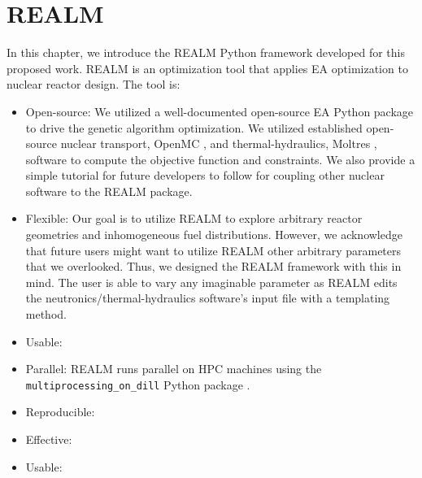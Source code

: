 \chapter{REALM}

In this chapter, we introduce the \gls{REALM} Python framework developed for this
proposed work.
\gls{REALM} is an optimization tool that applies \gls{EA} optimization to 
nuclear reactor design. 
The tool is:  
\begin{itemize}
    \item Open-source: We utilized a well-documented open-source \gls{EA} Python 
    package to drive the genetic algorithm optimization. We utilized established 
    open-source nuclear transport, OpenMC \cite{romano_openmc_2013}, and 
    thermal-hydraulics, Moltres \cite{lindsay_introduction_2018}, software to 
    compute the objective function and constraints. We also provide a simple 
    tutorial for future developers to follow for coupling other nuclear software 
    to the \gls{REALM} package.  
    \item Flexible: Our goal is to utilize \gls{REALM} to explore arbitrary 
    reactor geometries and inhomogeneous fuel distributions. However, we 
    acknowledge that future users might want to utilize \gls{REALM} other
    arbitrary parameters that we overlooked. Thus, we designed the \gls{REALM}
    framework with this in mind. The user is able to vary any imaginable parameter 
    as \gls{REALM} edits the neutronics/thermal-hydraulics software's input file 
    with a templating method.
    \item Usable: 
    \item Parallel: \gls{REALM} runs parallel on \gls{HPC} machines using the 
    \texttt{multiprocessing\_on\_dill} Python package 
    \cite{smallshire_multiprocessing_on_dill_nodate}.
    \item Reproducible: 
    \item Effective: 
    \item Usable: 
\end{itemize}